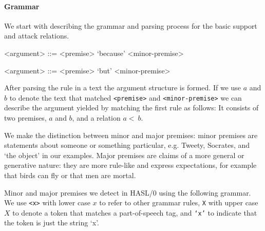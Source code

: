 \paragraph{Grammar} We start with describing the grammar and parsing process for the basic support and attack relations.

\begin{grammar}
<argument> ::= <premise> `because' <minor-premise> %

<argument> ::= <premise> `but' <minor-premise> %
\end{grammar}

\noindent After parsing the rule in a text the argument structure is formed. If we use $a$ and $b$ to denote the text that matched \texttt{<premise>} and \texttt{<minor-premise>} we can describe the argument yielded by matching the first rule as follows: It consists of two premises, $a$ and $b$, and a relation $a <~ b$.

We make the distinction between minor and major premises: minor premises are statements about someone or something particular, e.g. Tweety, Socrates, and `the object' in our examples. Major premises are claims of a more general or generative nature: they are more rule-like and express expectations, for example that birds can fly or that men are mortal.

Minor and major premises we detect in HASL/0 using the following grammar. We use \texttt{<x>} with lower case $x$ to refer to other grammar rules, \texttt{\<X\>} with upper case $X$ to denote a token that matches a part-of-speech tag, and \texttt{`x'} to indicate that the token is just the string `x'.

